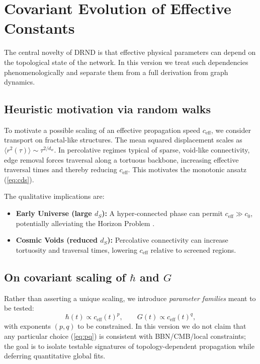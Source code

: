 \documentclass[12pt]{iopart}
\begin{document}
\section{Covariant Evolution of Effective Constants}

The central novelty of DRND is that effective physical parameters can depend on the topological state of the network. In this version we treat such dependencies phenomenologically and separate them from a full derivation from graph dynamics.

\subsection{Heuristic motivation via random walks}
To motivate a possible scaling of an effective propagation speed $c_{\mathrm{eff}}$, we consider transport on fractal-like structures. The mean squared displacement scales as $\langle r^2(\tau)\rangle \sim \tau^{2/d_w}$. In percolative regimes typical of sparse, void-like connectivity, edge removal forces traversal along a tortuous backbone, increasing effective traversal times and thereby reducing $c_{\mathrm{eff}}$. This motivates the monotonic ansatz (\ref{eq:cds}).

The qualitative implications are:
\begin{itemize}
    \item \textbf{Early Universe (large $d_S$):} A hyper-connected phase can permit $c_{\mathrm{eff}} \gg c_0$, potentially alleviating the Horizon Problem \cite{Magueijo2003}.
    \item \textbf{Cosmic Voids (reduced $d_S$):} Percolative connectivity can increase tortuosity and traversal times, lowering $c_{\mathrm{eff}}$ relative to screened regions.
\end{itemize}

\subsection{On covariant scaling of \texorpdfstring{$\hbar$}{hbar} and \texorpdfstring{$G$}{G}}
Rather than asserting a unique scaling, we introduce \emph{parameter families} meant to be tested:
\begin{equation}
\hbar(t) \propto c_{\mathrm{eff}}(t)^{p}, \qquad
G(t) \propto c_{\mathrm{eff}}(t)^{q},
\label{eq:pq}
\end{equation}
with exponents $(p,q)$ to be constrained.
In this version we do not claim that any particular choice (\ref{eq:pq}) is consistent with BBN/CMB/local constraints; the goal is to isolate testable signatures of topology-dependent propagation while deferring quantitative global fits.
\end{document}
